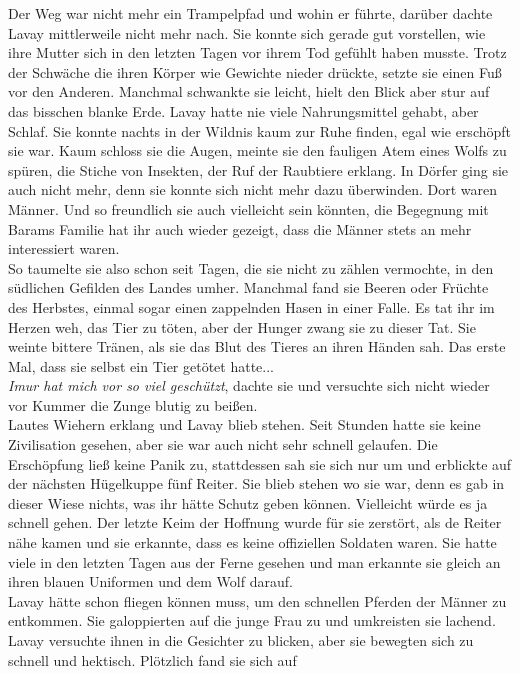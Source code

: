 Der Weg war nicht mehr ein Trampelpfad und wohin er führte, darüber dachte Lavay mittlerweile nicht 
mehr nach. Sie konnte sich gerade gut vorstellen, wie ihre Mutter sich in den letzten Tagen vor 
ihrem Tod gefühlt haben musste. Trotz der Schwäche die ihren Körper wie Gewichte nieder drückte, 
setzte sie einen Fuß vor den Anderen. Manchmal schwankte sie leicht, hielt den Blick aber stur auf 
das bisschen blanke Erde. Lavay hatte nie viele Nahrungsmittel gehabt, aber Schlaf. Sie konnte 
nachts in der Wildnis kaum zur Ruhe finden, egal wie erschöpft sie war. Kaum schloss sie die Augen, 
meinte sie den fauligen Atem eines Wolfs zu spüren, die Stiche von Insekten, der Ruf der Raubtiere 
erklang. In Dörfer ging sie auch nicht mehr, denn sie konnte sich nicht mehr dazu überwinden. Dort 
waren Männer. Und so freundlich sie auch vielleicht sein könnten, die Begegnung mit Barams Familie 
hat ihr auch wieder gezeigt, dass die Männer stets an mehr interessiert waren. \\
So taumelte sie also schon seit Tagen, die sie nicht zu zählen vermochte, in den südlichen Gefilden 
des Landes umher. Manchmal fand sie Beeren oder Früchte des Herbstes, einmal sogar einen zappelnden 
Hasen in einer Falle. Es tat ihr im Herzen weh, das Tier zu töten, aber der Hunger zwang sie zu 
dieser Tat. Sie weinte bittere Tränen, als sie das Blut des Tieres an ihren Händen sah. Das erste 
Mal, dass sie selbst ein Tier getötet hatte...\\
\textit{Imur hat mich vor so viel geschützt}, dachte sie und versuchte sich nicht wieder vor Kummer 
die Zunge blutig zu beißen.\\
Lautes Wiehern erklang und Lavay blieb stehen. Seit Stunden hatte sie keine Zivilisation gesehen, 
aber sie war auch nicht sehr schnell gelaufen. Die Erschöpfung ließ keine Panik zu, stattdessen sah 
sie sich nur um und erblickte auf der nächsten Hügelkuppe fünf Reiter. Sie blieb stehen wo sie war, 
denn es gab in dieser Wiese nichts, was ihr hätte Schutz geben können. Vielleicht würde es ja 
schnell gehen. Der letzte Keim der Hoffnung wurde für sie zerstört, als de Reiter nähe kamen und 
sie erkannte, dass es keine offiziellen Soldaten waren. Sie hatte viele in den letzten Tagen aus 
der Ferne gesehen und man erkannte sie gleich an ihren blauen Uniformen und dem Wolf darauf.\\ 
Lavay hätte schon fliegen können muss, um den schnellen Pferden der Männer zu entkommen. Sie 
galoppierten auf die junge Frau zu und umkreisten sie lachend. Lavay versuchte ihnen in die 
Gesichter zu blicken, aber sie bewegten sich zu schnell und hektisch. Plötzlich fand sie sich auf 
